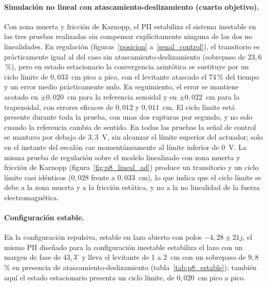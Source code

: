 \paragraph{Simulación no lineal con atascamiento-deslizamiento (cuarto objetivo).}
Con zona muerta y fricción de Karnopp, el PII estabiliza el sistema inestable en las tres pruebas realizadas sin compensar explícitamente ninguna de las dos no linealidades. En regulación (figuras~\ref{posicion} a~\ref{senal_control}), el transitorio es prácticamente igual al del caso sin atascamiento-deslizamiento (sobrepaso de $23{,}6$\,\%), pero en estado estacionario la convergencia asintótica se sustituye por un ciclo límite de $0{,}033$~cm pico a pico, con el levitante atascado el 74\,\% del tiempo y un error medio prácticamente nulo. En seguimiento, el error se mantiene acotado en $\pm0{,}020$~cm para la referencia senoidal y en $\pm0{,}022$~cm para la trapezoidal, con errores eficaces de $0{,}012$ y $0{,}011$~cm. El ciclo límite está presente durante toda la prueba, con unas dos rupturas por segundo, y no solo cuando la referencia cambia de sentido. En todas las pruebas la señal de control se mantuvo por debajo de $3{,}3$~V, sin alcanzar el límite superior del actuador; solo en el instante del escalón cae momentáneamente al límite inferior de 0~V. La misma prueba de regulación sobre el modelo linealizado con zona muerta y fricción de Karnopp (figura~\ref{fig:p8_lineal_ad}) produce un transitorio y un ciclo límite casi idénticos ($0{,}028$ frente a $0{,}033$~cm), lo que indica que el ciclo límite se debe a la zona muerta y a la fricción estática, y no a la no linealidad de la fuerza electromagnética.

\paragraph{Configuración estable.}
En la configuración repulsiva, estable en lazo abierto con polos $-4{,}28\pm21j$, el mismo PII diseñado para la configuración inestable estabiliza el lazo con un margen de fase de $43{,}3^\circ$ y lleva el levitante de 1 a 2~cm con un sobrepaso de $9{,}8$\,\% en presencia de atascamiento-deslizamiento (tabla~\ref{tab:p8_estable}); también aquí el estado estacionario presenta un ciclo límite, de $0{,}020$~cm pico a pico.

